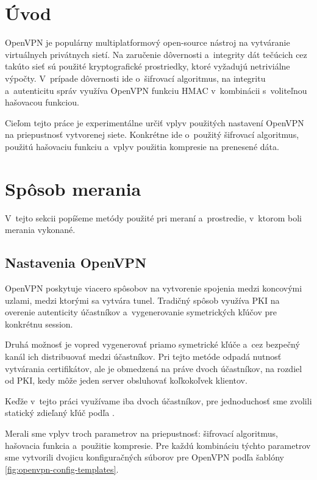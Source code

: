 \documentclass[12pt,a4paper]{article}
\begin{document}
\section{Úvod}

OpenVPN \cite{openvpn} je populárny multiplatformový open-source nástroj
na vytváranie virtuálnych privátnych sietí. Na zaručenie dôvernosti
a~integrity dát tečúcich cez takúto sieť sú použité kryptografické
prostriedky, ktoré vyžadujú netriviálne výpočty. V~prípade dôvernosti ide
o~šifrovací algoritmus, na integritu a~autenticitu správ využíva OpenVPN
funkciu HMAC v~kombinácii s~voliteľnou hašovacou funkciou.

Cieľom tejto práce je experimentálne určiť vplyv použitých nastavení
OpenVPN na priepustnosť vytvorenej siete. Konkrétne ide o~použitý
šifrovací algoritmus, použitú hašovaciu funkciu a~vplyv použitia kompresie
na prenesené dáta.

\section{Spôsob merania}

V~tejto sekcii popíšeme metódy použité pri meraní a~prostredie, v~ktorom
boli merania vykonané.

\subsection{Nastavenia OpenVPN}

OpenVPN poskytuje viacero spôsobov na vytvorenie spojenia medzi
koncovými uzlami, medzi ktorými sa vytvára tunel. Tradičný spôsob
využíva PKI na overenie autenticity účastníkov a~vygenerovanie
symetrických kľúčov pre konkrétnu session.

Druhá možnosť je vopred vygenerovať priamo symetrické kľúče a~cez bezpečný
kanál ich distribuovať medzi účastníkov. Pri tejto metóde odpadá nutnosť
vytvárania certifikátov, ale je obmedzená na práve dvoch účastníkov, na
rozdiel od PKI, kedy môže jeden server obsluhovať koľkokoľvek klientov.

Keďže v~tejto práci využívame iba dvoch účastníkov, pre jednoduchosť sme
zvolili statický zdieľaný kľúč podľa \cite{openvpn-static}.

Merali sme vplyv troch parametrov na priepustnosť: šifrovací algoritmus,
hašovacia funkcia a~použitie kompresie. Pre každú kombináciu týchto
parametrov sme vytvorili dvojicu konfiguračných súborov pre OpenVPN podľa
šablóny \ref{fig:openvpn-config-templates}.
\end{document}

